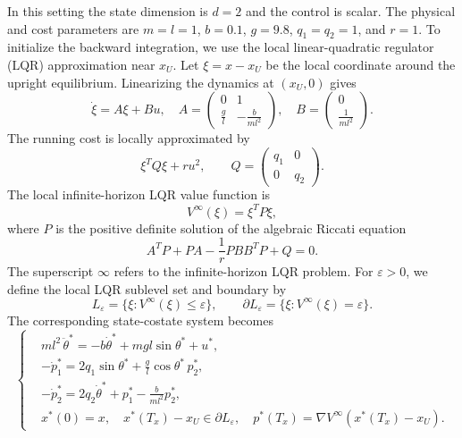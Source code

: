 \documentclass[11pt]{amsart}
\theoremstyle{definition}
\theoremstyle{remark}
\begin{document}
In this setting the state dimension is $d=2$ and the control is scalar.
The physical and cost parameters are $m = l = 1$, $b = 0.1$, $g = 9.8$,
$q_1 = q_2 = 1$, and $r = 1$.
To initialize the backward integration, we use the local linear-quadratic regulator (LQR) approximation near $x_U$.
Let $\xi=x-x_U$ be the local coordinate around the upright equilibrium.
Linearizing the dynamics at $(x_U,0)$ gives
\begin{equation*}
	\dot{\xi}=A\xi+Bu, \quad A= \begin{pmatrix} 0 & 1\\ \frac{g}{l} & -\frac{b}{ml^2} \end{pmatrix}, \quad B= \begin{pmatrix} 0\\ \frac{1}{ml^2} \end{pmatrix}.
\end{equation*}
The running cost is locally approximated by
\begin{equation*}
	\xi^TQ\xi + r u^2, \qquad Q= \begin{pmatrix} q_1 & 0\\ 0 & q_2 \end{pmatrix}.
\end{equation*}
The local infinite-horizon LQR value function is
\begin{equation*}
	V^\infty(\xi)=\xi^TP\xi,
\end{equation*}
where $P$ is the positive definite solution of the algebraic Riccati equation
\begin{equation*}
	A^TP+PA-\frac{1}{r}PBB^TP+Q=0.
\end{equation*}
The superscript $\infty$ refers to the infinite-horizon LQR problem.
For $\varepsilon>0$, we define the local LQR sublevel set and boundary by
\begin{equation*}
	L_\varepsilon=\{\xi:V^\infty(\xi)\leq \varepsilon\},
	\qquad
	\partial L_\varepsilon=\{\xi:V^\infty(\xi)=\varepsilon\}.
\end{equation*}
The corresponding state-costate system becomes
\begin{equation}
\label{TPBVP_pendulum}
\left\{
\begin{aligned}
	& ml^2\,\ddot{\theta}^* = -b\dot{\theta}^* + mgl\sin\theta^* + u^*,\\
	& -\dot{p}_1^* = 2q_1\sin\theta^* + \frac{g}{l}\cos\theta^*\,p_2^*,\\
	& -\dot{p}_2^* = 2q_2\dot{\theta}^* + p_1^* - \frac{b}{ml^2}p_2^*,\\
	& x^*(0)=x, \quad x^*(T_x)-x_U\in \partial L_\varepsilon, \quad p^*(T_x)=\nabla V^\infty(x^*(T_x)-x_U).
\end{aligned}
\right.
\end{equation}
\end{document}
